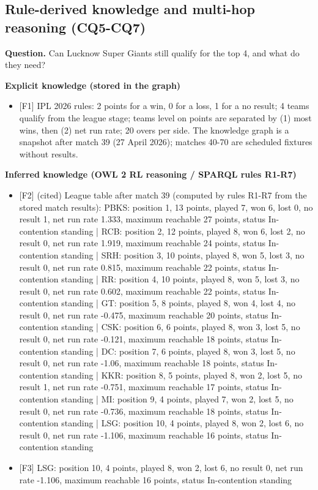 \subsection{Rule-derived knowledge and multi-hop reasoning (CQ5-CQ7)}
\noindent\textbf{Question.} Can Lucknow Super Giants still qualify for the top 4, and what do they need?\par\smallskip
\noindent\textcolor{kgexplicit}{\textbf{Explicit knowledge (stored in the graph)}}
\begin{itemize}\setlength\itemsep{0pt}\footnotesize
\item{} [F1] IPL 2026 rules: 2 points for a win, 0 for a loss, 1 for a no result; 4 teams qualify from the league stage; teams level on points are separated by (1) most wins, then (2) net run rate; 20 overs per side. The knowledge graph is a snapshot after match 39 (27 April 2026); matches 40-70 are scheduled fixtures without results.
\end{itemize}
\noindent\textcolor{kginferred}{\textbf{Inferred knowledge (OWL 2 RL reasoning / SPARQL rules R1-R7)}}
\begin{itemize}\setlength\itemsep{0pt}\footnotesize
\item{} [F2] (cited) League table after match 39 (computed by rules R1-R7 from the stored match results): PBKS: position 1, 13 points, played 7, won 6, lost 0, no result 1, net run rate 1.333, maximum reachable 27 points, status In-contention standing | RCB: position 2, 12 points, played 8, won 6, lost 2, no result 0, net run rate 1.919, maximum reachable 24 points, status In-contention standing | SRH: position 3, 10 points, played 8, won 5, lost 3, no result 0, net run rate 0.815, maximum reachable 22 points, status In-contention standing | RR: position 4, 10 points, played 8, won 5, lost 3, no result 0, net run rate 0.602, maximum reachable 22 points, status In-contention standing | GT: position 5, 8 points, played 8, won 4, lost 4, no result 0, net run rate -0.475, maximum reachable 20 points, status In-contention standing | CSK: position 6, 6 points, played 8, won 3, lost 5, no result 0, net run rate -0.121, maximum reachable 18 points, status In-contention standing | DC: position 7, 6 points, played 8, won 3, lost 5, no result 0, net run rate -1.06, maximum reachable 18 points, status In-contention standing | KKR: position 8, 5 points, played 8, won 2, lost 5, no result 1, net run rate -0.751, maximum reachable 17 points, status In-contention standing | MI: position 9, 4 points, played 7, won 2, lost 5, no result 0, net run rate -0.736, maximum reachable 18 points, status In-contention standing | LSG: position 10, 4 points, played 8, won 2, lost 6, no result 0, net run rate -1.106, maximum reachable 16 points, status In-contention standing
\item{} [F3] LSG: position 10, 4 points, played 8, won 2, lost 6, no result 0, net run rate -1.106, maximum reachable 16 points, status In-contention standing
\end{itemize}
